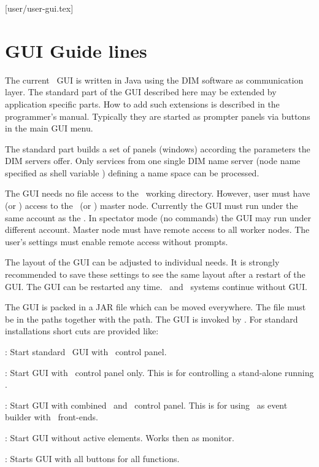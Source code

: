 [user/user-gui.tex]
\label{user-gui-chapter}
\section{GUI Guide lines}
The current \dabc\ GUI is written in Java using the DIM software as communication layer.
The standard part of the GUI described here may be extended by application specific parts.
How to add such extensions is described in the programmer's manual.
Typically they are started as prompter panels via buttons in the
main GUI menu.

The standard part builds a set of panels (windows) according the parameters
the DIM servers offer. Only services from one single DIM name server
(node name specified as shell variable )
defining a name space can be processed.

The GUI needs no file access to the \dabc\ working directory.
However, user must have  (or ) access to
the \dabc\ (or \mbs) master node.
Currently the GUI must run under the same account as the \dabc.
In spectator mode (no commands) the GUI may run under different account.
Master node must have remote access to all worker nodes.
The user's  settings must enable remote access without
prompts.

The layout of the GUI can be adjusted to individual needs.
It is strongly recommended to save these settings to see the same layout
after a restart of the GUI. The GUI can be restarted any time.
\dabc\ and \mbs\ systems continue without GUI.

The GUI is packed in a JAR file  which can be moved everywhere. The file must be in the
 paths together with the  path.
The GUI is invoked by .
For standard installations short cuts are provided like:
\bdes
\item[dabc]: Start standard \dabc\ GUI with \dabc\ control panel.
\item[mbs]: Start GUI with \mbs\ control panel only. 
This is for controlling a stand-alone running \mbs. 
\item[dabs]: Start GUI with combined \mbs\ and \dabc\ control panel.
This is for using \dabc\ as event builder with \mbs\ front-ends.
\item[moni]: Start GUI without active elements. Works then as monitor.
\item[guru]: Starts GUI with all buttons for all functions.
\edes

